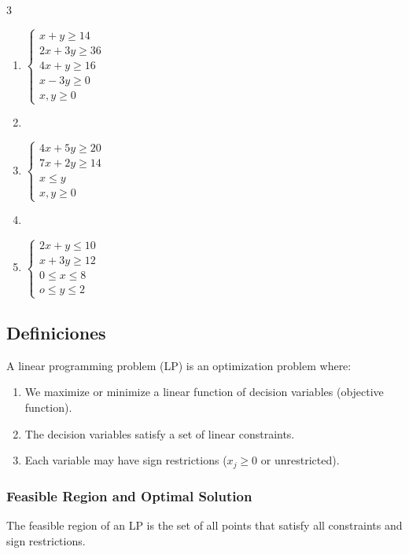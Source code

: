 \begin{Ejer}
\begin{multicols}{3}
\begin{enumerate}
\item $\left\{
\begin{array}{c}
x+y\geq14\\
2x+3y\geq36\\
4x+y\geq16\\
x-3y\geq0\\
x,y\geq0
\end{array}
\right.$


\item \item $\left\{
\begin{array}{c}
4x+5y\geq20\\
7x+2y\geq14\\
x\leq y\\
x,y\geq0
\end{array}
\right.$

\item \item $\left\{
\begin{array}{c}
2x+y\leq10\\
x+3y\geq12\\
0\leq x\leq8\\
o\leq y\leq2
\end{array}\right.$
\end{enumerate}
\end{multicols}
\end{Ejer}

\subsection{Definiciones}

A linear programming problem (LP) is an optimization problem where:

\begin{enumerate}
\item We maximize or minimize a linear function of decision variables (objective function).
\item The decision variables satisfy a set of linear constraints.
\item Each variable may have sign restrictions ($x_j \ge 0$ or unrestricted).
\end{enumerate}

\subsubsection*{Feasible Region and Optimal Solution}

\begin{Def}  
The feasible region of an LP is the set of all points that satisfy all constraints and sign restrictions.
\end{Def}


